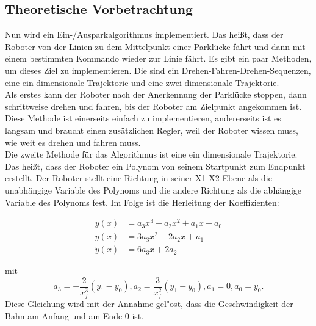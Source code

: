\subsection{Theoretische Vorbetrachtung}

Nun wird ein Ein-/Ausparkalgorithmus implementiert. Das heißt, dass der Roboter von der Linien zu dem Mittelpunkt einer Parklücke fährt und dann mit einem bestimmten Kommando wieder zur Linie fährt. Es gibt ein paar Methoden, um dieses Ziel zu implementieren. Die sind ein Drehen-Fahren-Drehen-Sequenzen, eine ein dimensionale Trajektorie und eine zwei dimensionale Trajektorie. \\

Als erstes kann der Roboter nach der Anerkennung der Parklücke stoppen, dann schrittweise drehen und fahren, bis der Roboter am Zielpunkt angekommen ist. Diese Methode ist einerseits einfach zu implementieren, andererseits ist es langsam und braucht einen zusätzlichen Regler, weil der Roboter wissen muss, wie weit es drehen und fahren muss. \\

Die zweite Methode für das Algorithmus ist eine ein dimensionale Trajektorie. Das heißt, dass der Roboter ein Polynom von seinem Startpunkt zum Endpunkt erstellt. Der Roboter stellt eine Richtung in seiner X1-X2-Ebene als die unabhängige Variable des Polynoms und die andere Richtung als die abhängige Variable des Polynoms fest. Im Folge ist die Herleitung der Koeffizienten: 

\begin{align*}
    y(x) &= a_3x^3 + a_2x^2 + a_1x + a_0 \\
    \dot{y}(x) &= 3a_3x^2 + 2a_2x + a_1 \\
    \ddot{y}(x) &= 6a_3x + 2a_2 
\end{align*} 

mit 
\begin{equation*}
    a_3 = -\frac{2}{x_f^3}(y_1 - y_0), a_2 = \frac{3}{x_f^2}(y_1 - y_0), a_1 = 0, a_0 = y_0.
\end{equation*}
Diese Gleichung wird mit der Annahme gel"ost, dass die Geschwindigkeit der Bahn am Anfang und am Ende 0 ist.

